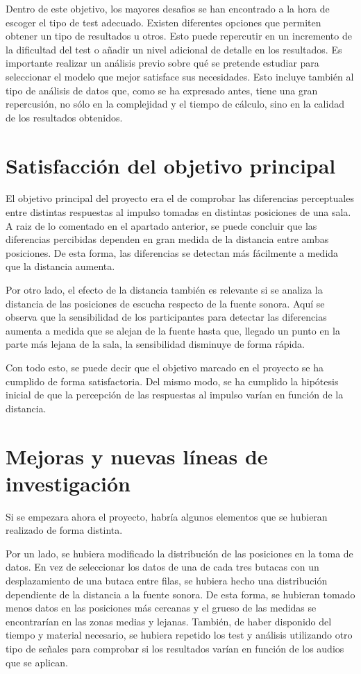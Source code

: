 \documentclass[11pt,a4paper]{book}
\begin{document}
            Dentro de este objetivo, los mayores desafios se han encontrado a la hora de escoger el tipo de test adecuado. Existen diferentes opciones que permiten obtener un tipo de resultados u otros. Esto puede repercutir en un incremento de la dificultad del test o añadir un nivel adicional de detalle en los resultados. Es importante realizar un análisis previo sobre qué se pretende estudiar para seleccionar el modelo que mejor satisface sus necesidades. Esto incluye también al tipo de análisis de datos que, como se ha expresado antes, tiene una gran repercusión, no sólo en la complejidad y el tiempo de cálculo, sino en la calidad de los resultados obtenidos.
    
    \section{Satisfacción del objetivo principal}
        El objetivo principal del proyecto era el de comprobar las diferencias perceptuales entre distintas respuestas al impulso tomadas en distintas posiciones de una sala. A raiz de lo comentado en el apartado anterior, se puede concluir que las diferencias percibidas dependen en gran medida de la distancia entre ambas posiciones. De esta forma, las diferencias se detectan más fácilmente a medida que la distancia aumenta.
        
        Por otro lado, el efecto de la distancia también es relevante si se analiza la distancia de las posiciones de escucha respecto de la fuente sonora. Aquí se observa que la sensibilidad de los participantes para detectar las diferencias aumenta a medida que se alejan de la fuente hasta que, llegado un punto en la parte más lejana de la sala, la sensibilidad disminuye de forma rápida.
        
        Con todo esto, se puede decir que el objetivo marcado en el proyecto se ha cumplido de forma satisfactoria. Del mismo modo, se ha cumplido la hipótesis inicial de que la percepción de las respuestas al impulso varían en función de la distancia.
    
    \section{Mejoras y nuevas líneas de investigación}
    
        Si se empezara ahora el proyecto, habría algunos elementos que se hubieran realizado de forma distinta.
        
        Por un lado, se hubiera modificado la distribución de las posiciones en la toma de datos. En vez de seleccionar los datos de una de cada tres butacas con un desplazamiento de una butaca entre filas, se hubiera hecho una distribución dependiente de la distancia a la fuente sonora. De esta forma, se hubieran tomado menos datos en las posiciones más cercanas y el grueso de las medidas se encontrarían en las zonas medias y lejanas. También, de haber disponido del tiempo y material necesario, se hubiera repetido los test y análisis utilizando otro tipo de señales para comprobar si los resultados varían en función de los audios que se aplican.
    
\end{document}
